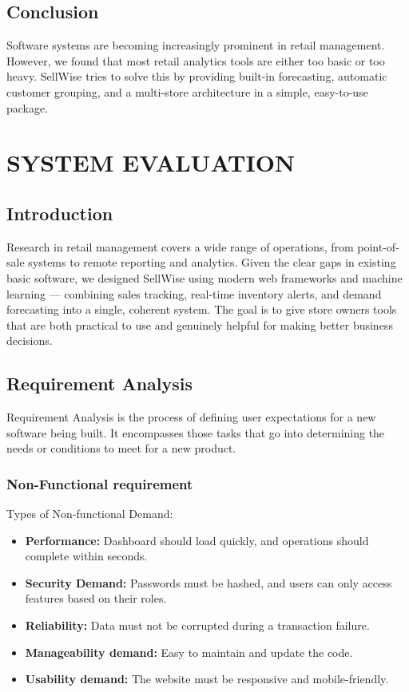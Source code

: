 \documentclass[12pt,a4paper]{report}
\begin{document}
\section{Conclusion}
Software systems are becoming increasingly prominent in retail management. However, we found that most retail analytics tools are either too basic or too heavy. SellWise tries to solve this by providing built-in forecasting, automatic customer grouping, and a multi-store architecture in a simple, easy-to-use package.


\chapter{SYSTEM EVALUATION}

\section{Introduction}
Research in retail management covers a wide range of operations, from point-of-sale systems to remote reporting and analytics. Given the clear gaps in existing basic software, we designed SellWise using modern web frameworks and machine learning — combining sales tracking, real-time inventory alerts, and demand forecasting into a single, coherent system. The goal is to give store owners tools that are both practical to use and genuinely helpful for making better business decisions.

\section{Requirement Analysis}
Requirement Analysis is the process of defining user expectations for a new software being built. It encompasses those tasks that go into determining the needs or conditions to meet for a new product.

\subsection{Non-Functional requirement}
Types of Non-functional Demand:
\begin{itemize}
    \item \textbf{Performance:} Dashboard should load quickly, and operations should complete within seconds.
    \item \textbf{Security Demand:} Passwords must be hashed, and users can only access features based on their roles.
    \item \textbf{Reliability:} Data must not be corrupted during a transaction failure.
    \item \textbf{Manageability demand:} Easy to maintain and update the code.
    \item \textbf{Usability demand:} The website must be responsive and mobile-friendly.
\end{itemize}
\end{document}
